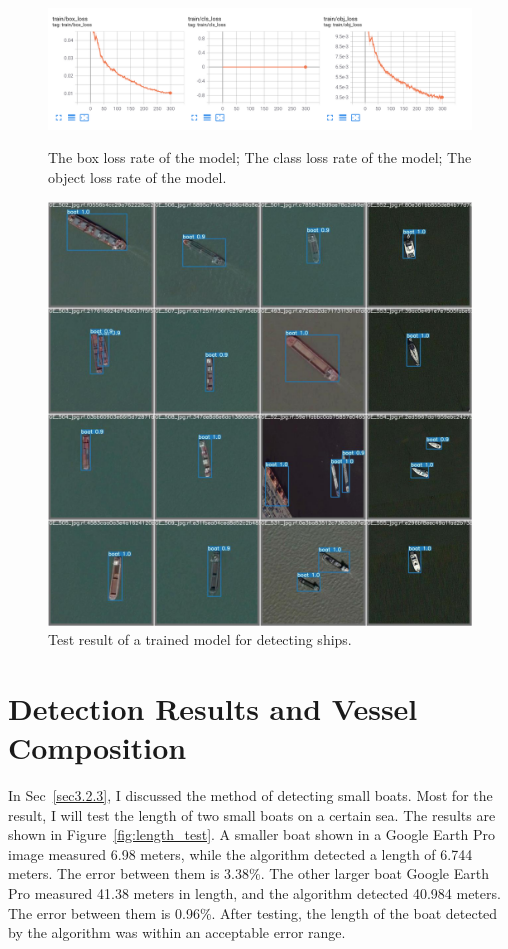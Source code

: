 \begin{figure}[!h]
    \centering
    \includegraphics[scale=0.4]{img/colab_train.png}
    \caption{The box loss rate of the model; The class loss rate of the model; The object loss rate of the model.}
    \label{fig:colab_train}


    \includegraphics[scale=0.25]{img/test_batch1_pred.jpg}
    \caption{Test result of a trained model for detecting ships.}
    \label{fig:test_batch1_pred}
\end{figure}


\newpage
\section{Detection Results and Vessel Composition}

In Sec~\ref{sec3.2.3}, I discussed the method of detecting small boats. Most for the result, I will test the length of two small boats on a certain sea. The results are shown in Figure~\ref{fig:length_test}. A smaller boat shown in a Google Earth Pro image measured 6.98 meters, while the algorithm detected a length of 6.744 meters. The error between them is 3.38\%. The other larger boat Google Earth Pro measured 41.38 meters in length, and the algorithm detected 40.984 meters. The error between them is 0.96\%. After testing, the length of the boat detected by the algorithm was within an acceptable error range.

